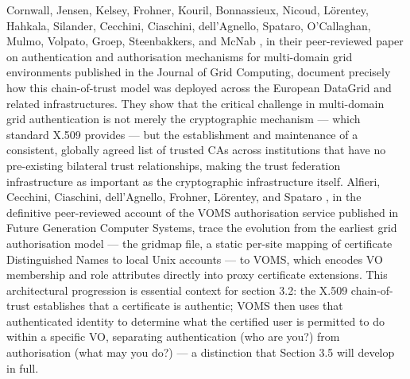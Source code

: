 \documentclass[12pt,a4paper]{report}
\begin{document}
Cornwall, Jensen, Kelsey, Frohner, Kouril, Bonnassieux, Nicoud, Lörentey, Hahkala, Silander, Cecchini, Ciaschini, dell’Agnello, Spataro, O’Callaghan, 
Mulmo, Volpato, Groep, Steenbakkers, and McNab \parencite{cornwall2004authentication}, in their peer-reviewed paper on authentication and authorisation mechanisms for multi-domain 
grid environments published in the Journal of Grid Computing, document precisely how this chain-of-trust model was deployed across the European DataGrid
 and related infrastructures. They show that the critical challenge in multi-domain grid authentication is not merely the cryptographic mechanism — which 
 standard X.509 provides — but the establishment and maintenance of a consistent, globally agreed list of trusted CAs across institutions that have 
 no pre-existing bilateral trust relationships, making the trust federation infrastructure as important as the cryptographic infrastructure itself.
  Alfieri, Cecchini, Ciaschini, dell’Agnello, Frohner, Lörentey, and Spataro \parencite{alfieri2005voms}, in the definitive peer-reviewed account of the VOMS authorisation
   service published in Future Generation Computer Systems, trace the evolution from the earliest grid authorisation model — the gridmap file, a static 
   per-site mapping of certificate Distinguished Names to local Unix accounts — to VOMS, which encodes VO membership and role attributes directly into 
   proxy certificate extensions. This architectural progression is essential context for section 3.2: the X.509 chain-of-trust establishes that a 
   certificate is authentic; VOMS then uses that authenticated identity to determine what the certified user is permitted to do within a specific VO, 
   separating authentication (who are you?) from authorisation (what may you do?) — a distinction that Section 3.5 will develop in full.
\end{document}
